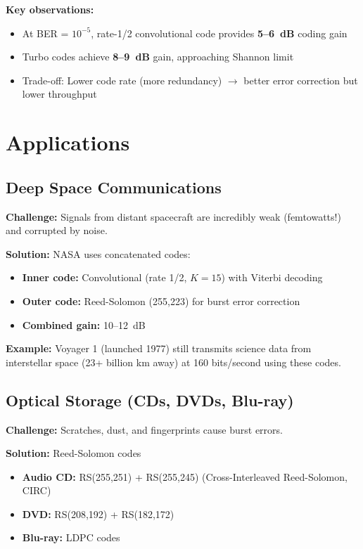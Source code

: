 \textbf{Key observations:}
\begin{itemize}
\item At BER = $10^{-5}$, rate-1/2 convolutional code provides \textbf{5--6~dB} coding gain
\item Turbo codes achieve \textbf{8--9~dB} gain, approaching Shannon limit
\item Trade-off: Lower code rate (more redundancy) $\rightarrow$ better error correction but lower throughput
\end{itemize}

\section{Applications}

\subsection{Deep Space Communications}

\textbf{Challenge:} Signals from distant spacecraft are incredibly weak (femtowatts!) and corrupted by noise.

\textbf{Solution:} NASA uses concatenated codes:
\begin{itemize}
\item \textbf{Inner code:} Convolutional (rate 1/2, $K=15$) with Viterbi decoding
\item \textbf{Outer code:} Reed-Solomon (255,223) for burst error correction
\item \textbf{Combined gain:} 10--12~dB
\end{itemize}

\textbf{Example:} Voyager 1 (launched 1977) still transmits science data from interstellar space (23+ billion km away) at 160 bits/second using these codes.

\subsection{Optical Storage (CDs, DVDs, Blu-ray)}

\textbf{Challenge:} Scratches, dust, and fingerprints cause burst errors.

\textbf{Solution:} Reed-Solomon codes
\begin{itemize}
\item \textbf{Audio CD:} RS(255,251) + RS(255,245) (Cross-Interleaved Reed-Solomon, CIRC)
\item \textbf{DVD:} RS(208,192) + RS(182,172)
\item \textbf{Blu-ray:} LDPC codes
\end{itemize}

